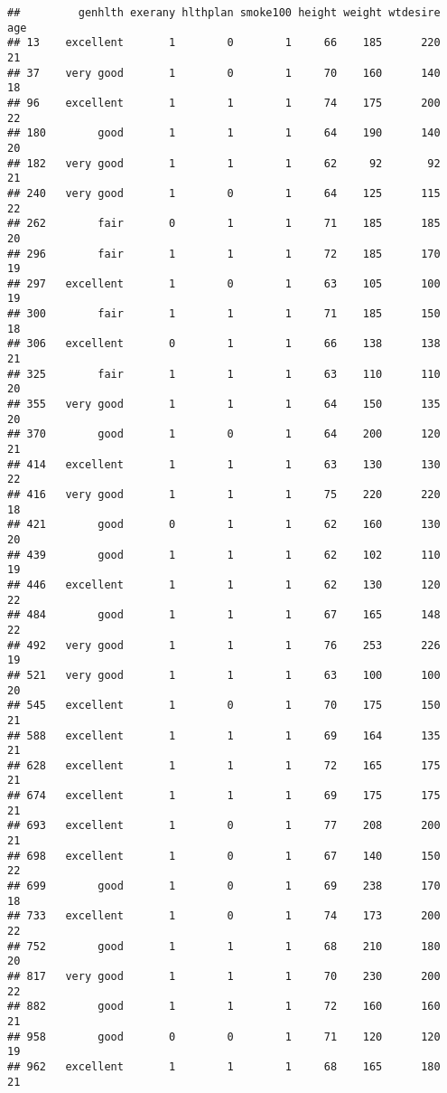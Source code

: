 \documentclass[]{article}
\begin{document}
\begin{verbatim}
##         genhlth exerany hlthplan smoke100 height weight wtdesire age
## 13    excellent       1        0        1     66    185      220  21
## 37    very good       1        0        1     70    160      140  18
## 96    excellent       1        1        1     74    175      200  22
## 180        good       1        1        1     64    190      140  20
## 182   very good       1        1        1     62     92       92  21
## 240   very good       1        0        1     64    125      115  22
## 262        fair       0        1        1     71    185      185  20
## 296        fair       1        1        1     72    185      170  19
## 297   excellent       1        0        1     63    105      100  19
## 300        fair       1        1        1     71    185      150  18
## 306   excellent       0        1        1     66    138      138  21
## 325        fair       1        1        1     63    110      110  20
## 355   very good       1        1        1     64    150      135  20
## 370        good       1        0        1     64    200      120  21
## 414   excellent       1        1        1     63    130      130  22
## 416   very good       1        1        1     75    220      220  18
## 421        good       0        1        1     62    160      130  20
## 439        good       1        1        1     62    102      110  19
## 446   excellent       1        1        1     62    130      120  22
## 484        good       1        1        1     67    165      148  22
## 492   very good       1        1        1     76    253      226  19
## 521   very good       1        1        1     63    100      100  20
## 545   excellent       1        0        1     70    175      150  21
## 588   excellent       1        1        1     69    164      135  21
## 628   excellent       1        1        1     72    165      175  21
## 674   excellent       1        1        1     69    175      175  21
## 693   excellent       1        0        1     77    208      200  21
## 698   excellent       1        0        1     67    140      150  22
## 699        good       1        0        1     69    238      170  18
## 733   excellent       1        0        1     74    173      200  22
## 752        good       1        1        1     68    210      180  20
## 817   very good       1        1        1     70    230      200  22
## 882        good       1        1        1     72    160      160  21
## 958        good       0        0        1     71    120      120  19
## 962   excellent       1        1        1     68    165      180  21

\end{verbatim}
\end{document}

